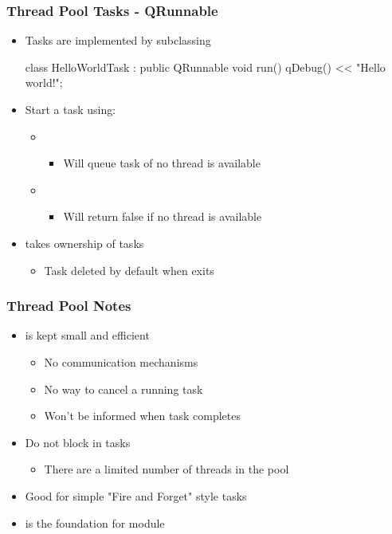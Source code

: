\begin{slide}[fragile]
\frametitle{Thread Pool Tasks - QRunnable}

\begin{itemize}
\item Tasks are implemented by subclassing 
\begin{cpp}
class HelloWorldTask : public QRunnable
{
    void run() { qDebug() << "Hello world!"; }
}
\end{cpp}
\item Start a  task using:
  \begin{itemize}
  \item {}
    \begin{itemize}
    \item Will queue task of no thread is available
    \end{itemize}
  \item {}
    \begin{itemize}
    \item Will return false if no thread is available
    \end{itemize}
  \end{itemize}
\item {} takes ownership of  tasks
  \begin{itemize}
  \item Task deleted by default when  exits
  \end{itemize}
\end{itemize}

\end{slide}


\begin{slide}
\frametitle{Thread Pool Notes}

\begin{itemize}
\item {} is kept small and efficient
  \begin{itemize}
  \item No communication mechanisms
  \item No way to cancel a running task
  \item Won't be informed when task completes
  \end{itemize}
\item Do not block in tasks
  \begin{itemize}
  \item There are a limited number of threads in the pool
  \end{itemize}
\item Good for simple "Fire and Forget" style tasks
\vspace{1em}
\item {} is the foundation for  module
\end{itemize}

\end{slide}

